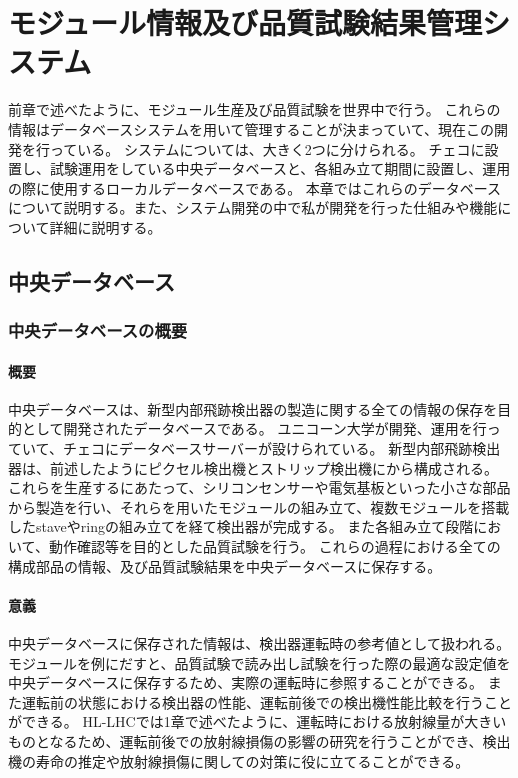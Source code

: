 \chapter{モジュール情報及び品質試験結果管理システム}
前章で述べたように、モジュール生産及び品質試験を世界中で行う。
これらの情報はデータベースシステムを用いて管理することが決まっていて、現在この開発を行っている。
システムについては、大きく2つに分けられる。
チェコに設置し、試験運用をしている中央データベースと、各組み立て期間に設置し、運用の際に使用するローカルデータベースである。
本章ではこれらのデータベースについて説明する。また、システム開発の中で私が開発を行った仕組みや機能について詳細に説明する。

\section{中央データベース}
\subsection{中央データベースの概要}
\subsubsection{概要}
中央データベースは、新型内部飛跡検出器の製造に関する全ての情報の保存を目的として開発されたデータベースである。
ユニコーン大学が開発、運用を行っていて、チェコにデータベースサーバーが設けられている。
新型内部飛跡検出器は、前述したようにピクセル検出機とストリップ検出機にから構成される。
これらを生産するにあたって、シリコンセンサーや電気基板といった小さな部品から製造を行い、それらを用いたモジュールの組み立て、複数モジュールを搭載したstaveやringの組み立てを経て検出器が完成する。
また各組み立て段階において、動作確認等を目的とした品質試験を行う。
これらの過程における全ての構成部品の情報、及び品質試験結果を中央データベースに保存する。

\subsubsection{意義}
中央データベースに保存された情報は、検出器運転時の参考値として扱われる。
モジュールを例にだすと、品質試験で読み出し試験を行った際の最適な設定値を中央データベースに保存するため、実際の運転時に参照することができる。
また運転前の状態における検出器の性能、運転前後での検出機性能比較を行うことができる。
HL-LHCでは1章で述べたように、運転時における放射線量が大きいものとなるため、運転前後での放射線損傷の影響の研究を行うことができ、検出機の寿命の推定や放射線損傷に関しての対策に役に立てることができる。

